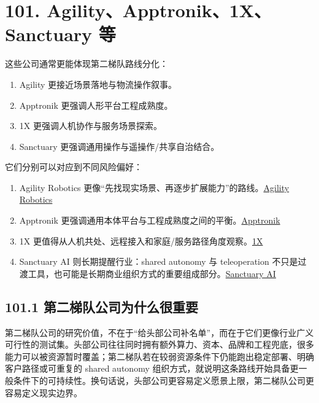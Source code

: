 \section*{101. Agility、Apptronik、1X、Sanctuary 等}

这些公司通常更能体现第二梯队路线分化：

\begin{enumerate}
\item Agility 更接近场景落地与物流操作叙事。
\item Apptronik 更强调人形平台工程成熟度。
\item 1X 更强调人机协作与服务场景探索。
\item Sanctuary 更强调通用操作与遥操作/共享自治结合。
\end{enumerate}

它们分别可以对应到不同风险偏好：

\begin{enumerate}
\item Agility Robotics 更像“先找现实场景、再逐步扩展能力”的路线。\href{https://agilityrobotics.com/}{Agility Robotics}
\item Apptronik 更强调通用本体平台与工程成熟度之间的平衡。\href{https://apptronik.com/}{Apptronik}
\item 1X 更值得从人机共处、远程接入和家庭/服务路径角度观察。\href{https://www.1x.tech/}{1X}
\item Sanctuary AI 则长期提醒行业：shared autonomy 与 teleoperation 不只是过渡工具，也可能是长期商业组织方式的重要组成部分。\href{https://www.sanctuary.ai/}{Sanctuary AI}
\end{enumerate}

\subsection*{101.1 第二梯队公司为什么很重要}


第二梯队公司的研究价值，不在于“给头部公司补名单”，而在于它们更像行业广义可行性的测试集。头部公司往往同时拥有额外算力、资本、品牌和工程兜底，很多能力可以被资源暂时覆盖；第二梯队若在较弱资源条件下仍能跑出稳定部署、明确客户路径或可重复的 shared autonomy 组织方式，就说明这条路线开始具备更一般条件下的可持续性。换句话说，头部公司更容易定义愿景上限，第二梯队公司更容易定义现实边界。

